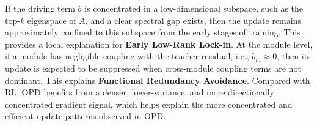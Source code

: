 \documentclass{article}
\begin{document}
If the driving term \(b\) is concentrated in a low-dimensional subspace, such as the top-\(k\) eigenspace of \(A\), and a clear spectral gap exists, then the update remains approximately confined to this subspace from the early stages of training. This provides a local explanation for \textbf{Early Low-Rank Lock-in}. 
At the module level, if a module has negligible coupling with the teacher residual, i.e., \(b_m\approx 0\), then its update is expected to be suppressed when cross-module coupling terms are not dominant. This explains \textbf{Functional Redundancy Avoidance}. 
Compared with RL, OPD benefits from a denser, lower-variance, and more directionally concentrated gradient signal, which helps explain the more concentrated and efficient update patterns observed in OPD.






\end{document}
